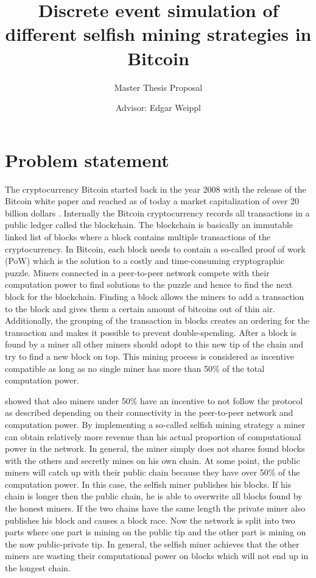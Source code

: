 \documentclass{scrartcl}
\title{Discrete event simulation of different selfish mining strategies in Bitcoin}
\subtitle{Master Thesis Proposal}
\author{Advisor: Edgar Weippl}
\begin{document}
\maketitle

\section{Problem statement}
The cryptocurrency Bitcoin started back in the year 2008 with the release of the Bitcoin white paper \cite{nakamoto2008bitcoin} and reached as of today a market capitalization of over 20 billion dollars \cite{MarketCap2017, Coindesk2017}. Internally the Bitcoin cryptocurrency records all transactions in a public ledger called the blockchain. The blockchain is basically an immutable linked list of blocks where a block contains multiple transactions of the cryptocurrency. In Bitcoin, each block needs to contain a so-called proof of work (PoW) which is the solution to a costly and time-consuming cryptographic puzzle. Miners connected in a peer-to-peer network compete with their computation power to find solutions to the puzzle and hence to find the next block for the blockchain. Finding a block allows the miners to add a transaction to the block and gives them a certain amount of bitcoins out of thin air. Additionally, the grouping of the transaction in blocks creates an ordering for the transaction and makes it possible to prevent double-spending. After a block is found by a miner all other miners should adopt to this new tip of the chain and try to find a new block on top. This mining process is considered as incentive compatible as long as no single miner has more than 50\% of the total computation power.

\citeauthor{eyal2014majority} showed that also miners under 50\% have an incentive to not follow the protocol as described depending on their connectivity in the peer-to-peer network and computation power. By implementing a so-called selfish mining strategy a miner can obtain relatively more revenue than his actual proportion of computational power in the network. In general, the miner simply does not shares found blocks with the others and secretly mines on his own chain. At some point, the public miners will catch up with their public chain because they have over 50\% of the computation power. In this case, the selfish miner publishes his blocks. If his chain is longer then the public chain, he is able to overwrite all blocks found by the honest miners. If the two chains have the same length the private miner also publishes his block and causes a block race. Now the network is split into two parts where one part is mining on the public tip and the other part is mining on the now public-private tip. In general, the selfish miner achieves that the other miners are wasting their computational power on blocks which will not end up in the longest chain.
\end{document}
